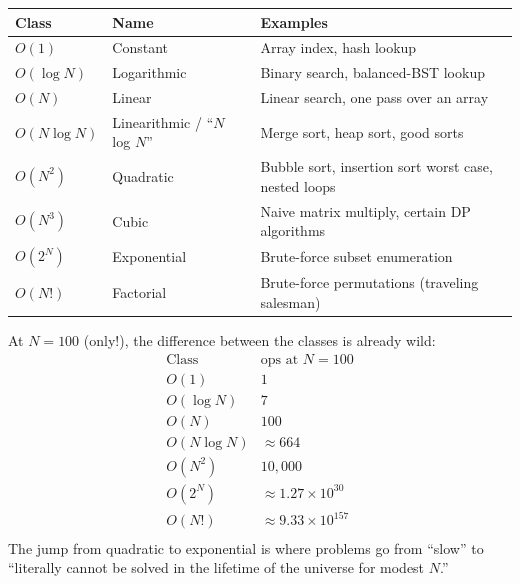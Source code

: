 \documentclass[11pt]{article}
\begin{document}
\begin{center}
\footnotesize
\renewcommand{\arraystretch}{1.3}
\begin{tabular}{@{}lll@{}}
\hline
\textbf{Class} & \textbf{Name}             & \textbf{Examples} \\
\hline
$O(1)$         & Constant                  & Array index, hash lookup \\
$O(\log N)$    & Logarithmic               & Binary search, balanced-BST lookup \\
$O(N)$         & Linear                    & Linear search, one pass over an array \\
$O(N \log N)$  & Linearithmic / ``$N$ log $N$'' & Merge sort, heap sort, good sorts \\
$O(N^2)$       & Quadratic                 & Bubble sort, insertion sort worst case, nested loops \\
$O(N^3)$       & Cubic                     & Naive matrix multiply, certain DP algorithms \\
$O(2^N)$       & Exponential               & Brute-force subset enumeration \\
$O(N!)$        & Factorial                 & Brute-force permutations (traveling salesman) \\
\hline
\end{tabular}
\end{center}

\begin{ideabox}
\footnotesize
\renewcommand{\arraystretch}{1.2}
At $N = 100$ (only!), the difference between the classes is already
wild:
\[
\begin{array}{r|r}
\text{Class} & \text{ops at } N=100 \\ \hline
O(1)           & 1 \\
O(\log N)      & 7 \\
O(N)           & 100 \\
O(N \log N)    & \approx 664 \\
O(N^2)         & 10{,}000 \\
O(2^N)         & \approx 1.27 \times 10^{30} \\
O(N!)          & \approx 9.33 \times 10^{157} \\
\end{array}
\]
The jump from quadratic to exponential is where problems go from
``slow'' to ``literally cannot be solved in the lifetime of the
universe for modest $N$.''
\end{ideabox}
\end{document}
